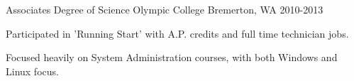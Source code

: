 


\begin{cventries}


\cventry
{Associates Degree of Science} %
{Olympic College} %
{Bremerton, WA} %
{2010-2013} %
{ %
\begin{cvitems}
\item {Participated in 'Running Start' with A.P. credits and full time technician jobs.}
\item {Focused heavily on System Administration courses, with both Windows and Linux focus.}
\end{cvitems}
}


\end{cventries}
